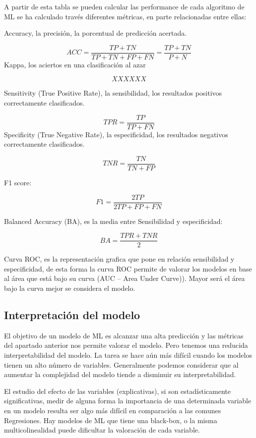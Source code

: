 \documentclass[
]{article}
\begin{document}
A partir de esta tabla se pueden calcular las performance de cada
algoritmo de ML se ha calculado través diferentes métricas, en parte
relacionadas entre ellas:

Accuracy, la precisión, la porcentual de predicción acertada.

\[
ACC = \frac{TP + TN}{TP+TN+FP+FN} = \frac{TP + TN}{P + N}
\] Kappa, los aciertos en una clasificación al azar

\[
XXXXXX
\]

Sensitivity (True Positive Rate), la sensibilidad, los resultados
positivos correctamente clasificados.

\[
TPR = \frac{TP}{TP+FN}
\] Specificity (True Negative Rate), la especificidad, los resultados
negativos correctamente clasificados.

\[
TNR = \frac{TN}{TN+FP}
\]

F1 score:

\[
F1 = \frac{2TP}{2TP + FP + FN}
\]

Balanced Accuracy (BA), es la media entre Sensibilidad y especificidad:

\[
BA = \frac{TPR + TNR}{2}
\]

Curva ROC, es la representación grafica que pone en relación
sensibilidad y especificidad, de esta forma la curva ROC permite de
valorar los modelos en base al área que está bajo su curva (AUC -- Area
Under Curve)). Mayor será el área bajo la curva mejor se considera el
modelo.

\hypertarget{interpretaciuxf3n-del-modelo}{%
\subsection{Interpretación del
modelo}\label{interpretaciuxf3n-del-modelo}}

El objetivo de un modelo de ML es alcanzar una alta predicción y las
métricas del apartado anterior nos permite valorar el modelo. Pero
tenemos una reducida interpretabilidad del modelo. La tarea se hace aún
más difícil cuando los modelos tienen un alto número de variables.
Generalmente podemos considerar que al aumentar la complejidad del
modelo tiende a disminuir su interpretabilidad.

El estudio del efecto de las variables (explicativas), si son
estadísticamente significativas, medir de alguna forma la importancia de
una determinada variable en un modelo resulta ser algo más difícil en
comparación a las comunes Regresiones. Hay modelos de ML que tiene una
black-box, o la misma multicolinealidad puede dificultar la valoración
de cada variable.
\end{document}
